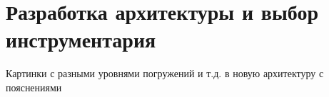 \section{Разработка архитектуры и выбор инструментария}
\label{sec:tools}

Картинки с разными уровнями погружений и т.д. в новую архитектуру с пояснениями

% 
% 
% 
